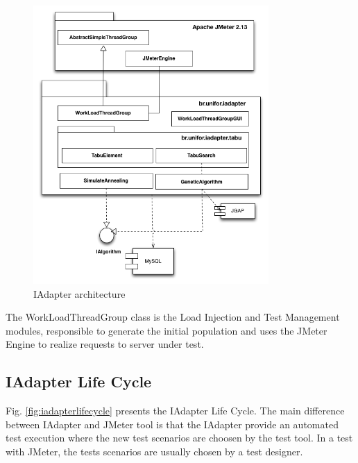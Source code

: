\begin{figure}[h]
\center
\includegraphics[width=0.8\textwidth]{./images/iadapter1.png}
\caption{IAdapter architecture}
\label{fig:iadapterarchitecture}
\end{figure}

The WorkLoadThreadGroup class is the Load Injection and Test Management modules, responsible to generate the initial population and uses the JMeter Engine to realize requests to server under test. 

\subsection{IAdapter Life Cycle}
 
Fig. \ref{fig:iadapterlifecycle} presents the IAdapter Life Cycle. The main difference between IAdapter and JMeter tool is that the IAdapter provide an automated test execution where the new test scenarios are choosen by the test tool.  In a test with JMeter, the tests scenarios are usually chosen by a test designer.

